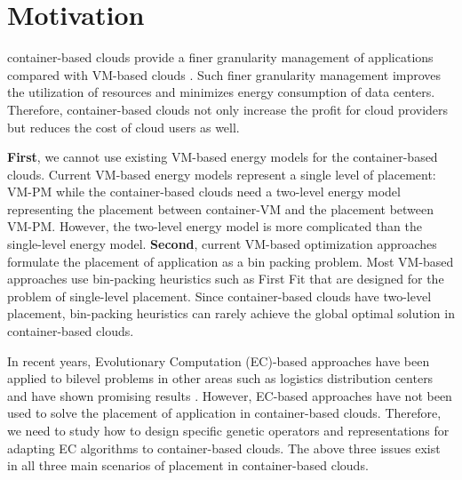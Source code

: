 \section{Motivation}
\label{sec:motivation}

 container-based clouds provide a finer granularity management of applications compared with VM-based clouds \cite{:2017ff}. Such finer granularity management improves the utilization of resources and minimizes energy consumption of data centers. Therefore, container-based clouds not only increase the profit for cloud providers but reduces the cost of cloud users as well.

 \textbf{First}, we cannot use existing VM-based energy models for the container-based clouds. Current VM-based energy models represent a single level of placement: VM-PM while the container-based clouds need a two-level energy model representing the placement between container-VM and the placement between VM-PM. However, the two-level energy model is more complicated than the single-level energy model. 
\textbf{Second}, current VM-based optimization approaches \cite{Beloglazov:2010dt, Liu:2013kl} formulate the placement of application as a bin packing problem. Most VM-based approaches use bin-packing heuristics such as First Fit \cite{Dosa:2013ie} that are designed for the problem of single-level placement. Since container-based clouds have two-level placement,  bin-packing heuristics can rarely achieve the global optimal solution in container-based clouds. 


In recent years, Evolutionary Computation (EC)-based approaches have been applied to bilevel problems in other areas such as logistics distribution centers and have shown promising results \cite{Angelo:2013ee, Sinha:2017et, Deb:2010in}. However, EC-based approaches have not been used to solve the placement of application in container-based clouds. Therefore, we need to study how to design specific genetic operators and representations for adapting EC algorithms to container-based clouds.  The above three issues exist in all three main scenarios of placement in container-based clouds. 

